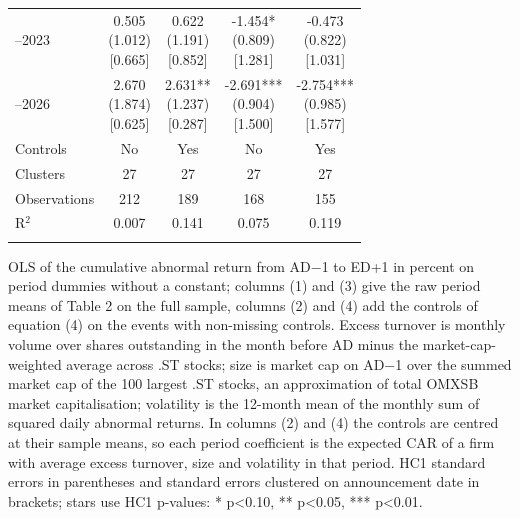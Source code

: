 \begin{threeparttable}
\begin{tabular}{@{}lcccc}
\addlinespace[0.25ex]
\addlinespace[0.25ex]
2021–2023 & \makecell{0.505 \\ (1.012) \\{}[0.665]} & \makecell{0.622 \\ (1.191) \\{}[0.852]} & \makecell{-1.454* \\ (0.809) \\{}[1.281]} & \makecell{-0.473 \\ (0.822) \\{}[1.031]} \\
\addlinespace[0.25ex]
\addlinespace[0.25ex]
2024–2026 & \makecell{2.670 \\ (1.874) \\{}[0.625]} & \makecell{2.631** \\ (1.237) \\{}[0.287]} & \makecell{-2.691*** \\ (0.904) \\{}[1.500]} & \makecell{-2.754*** \\ (0.985) \\{}[1.577]} \\
\addlinespace[0.25ex]
\midrule
\addlinespace[1ex]
Controls & No & Yes & No & Yes \\
\addlinespace[0.25ex]
\addlinespace[0.25ex]
Clusters & 27 & 27 & 27 & 27 \\
\addlinespace[0.25ex]
\addlinespace[0.25ex]
Observations & 212 & 189 & 168 & 155 \\
\addlinespace[0.25ex]
\addlinespace[0.25ex]
R$^2$ & 0.007 & 0.141 & 0.075 & 0.119 \\
\addlinespace[0.25ex]
\bottomrule
\end{tabular}
\endgroup
\noindent\begin{minipage}{\linewidth}\smallskip\footnotesize
OLS of the cumulative abnormal return from AD$-$1 to ED+1 in percent on period dummies without a constant; columns (1) and (3) give the raw period means of Table 2 on the full sample, columns (2) and (4) add the controls of equation (4) on the events with non-missing controls. Excess turnover is monthly volume over shares outstanding in the month before AD minus the market-cap-weighted average across .ST stocks; size is market cap on AD$-$1 over the summed market cap of the 100 largest .ST stocks, an approximation of total OMXSB market capitalisation; volatility is the 12-month mean of the monthly sum of squared daily abnormal returns. In columns (2) and (4) the controls are centred at their sample means, so each period coefficient is the expected CAR of a firm with average excess turnover, size and volatility in that period. HC1 standard errors in parentheses and standard errors clustered on announcement date in brackets; stars use HC1 p-values: * p<0.10, ** p<0.05, *** p<0.01.\end{minipage}

\end{threeparttable}